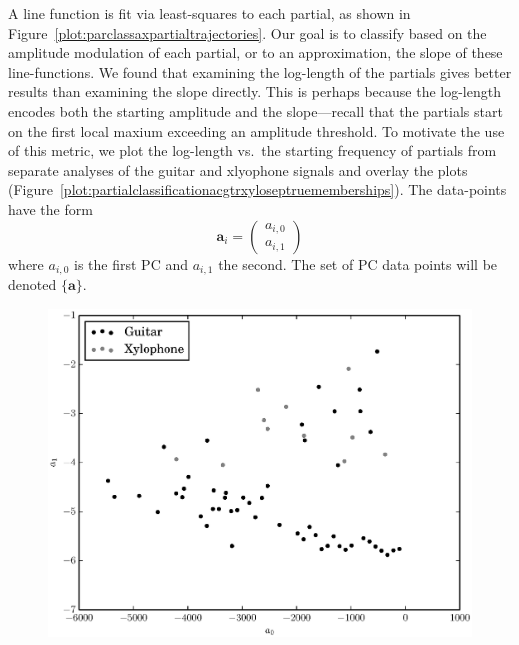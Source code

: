 A line function is fit via least-squares to each partial, as shown in
Figure~\ref{plot:parclassaxpartialtrajectories}. Our goal is to classify based
on the amplitude modulation of each partial, or to an approximation, the slope of these line-functions. We found that examining the log-length of the
partials gives better results than examining the slope directly. This is perhaps
because the log-length encodes both the starting amplitude and the slope---recall
that the partials start on the first local maxium exceeding an amplitude
threshold. To motivate the use of this metric, we plot the log-length vs.\ the
starting frequency of
partials from separate analyses of the guitar and xlyophone signals and overlay
the plots (Figure~\ref{plot:partialclassificationacgtrxyloseptruememberships}).
The data-points have the form
\[
    \boldsymbol{a}_i = \begin{pmatrix}
        a_{i,0} \\
        a_{i,1}
    \end{pmatrix}
\]
where $a_{i,0}$ is the first PC and $a_{i,1}$ the second. The set of PC data
points will be denoted $\{\boldsymbol{a}\}$.
\begin{figure}[!t]
    \centering
    \includegraphics[width=\figwidthscale\textwidth]{plots/partial_classification_acgtr_xylo_sep_true_memberships.eps}
\end{figure}
